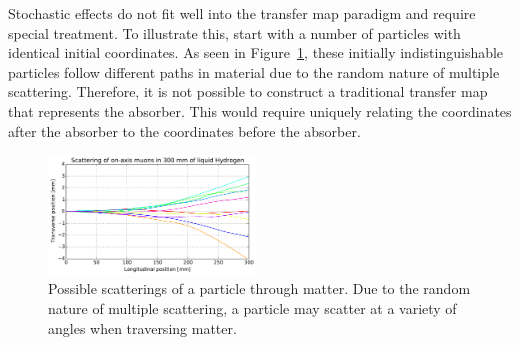 \documentclass{jacow}
\begin{document}
Stochastic effects do not fit well into the transfer map paradigm and require special treatment. To illustrate this, start with a number of particles with identical initial coordinates. As seen in Figure~\ref{fig:mult_scattering}, these initially indistinguishable particles follow different paths in material due to the random nature of multiple scattering. Therefore, it is not possible to construct a traditional transfer map that represents the absorber. This would require uniquely relating the coordinates after the absorber to the coordinates before the absorber.

\begin{figure}[htb]
\centering
\includegraphics[width=0.49\textwidth]{figures/p10tr.pdf}
\caption{Possible scatterings of a particle through matter. Due to the random nature of multiple scattering, a particle may scatter at a variety of angles when traversing matter.}
\label{fig:mult_scattering}
\end{figure}

\end{document}

